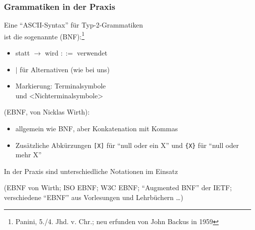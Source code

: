 \documentclass[onlymath]{beamer}
\begin{document}
\begin{frame}\frametitle{Grammatiken in der Praxis}

Eine "`ASCII-Syntax"' für Typ-2-Grammatiken\\ ist die sogenannte  (BNF):\footnote{Panini, 5./4. Jhd. v. Chr.; neu erfunden von John Backus in 1959}

\begin{itemize}
\item statt $\to$ wird \alert{$\mathtt{::=}$} verwendet 
\item \alert{$\mid$} für Alternativen (wie bei uns)
\item Markierung: \alert{\squote}Terminalsymbole\alert{\squote}\\
      und {\alert{$\texttt{<}$}Nichterminalsymbole\alert{$\texttt{>}$}}
\end{itemize}

%
\pause{} (EBNF, von Nicklas Wirth):
\begin{itemize}
\item allgemein wie BNF, aber Konkatenation mit Kommas
\item Zusätzliche Abkürzungen \alert{\texttt{[X]}} für "`null oder ein X"' und \alert{\texttt{\{X\}}} für "`null oder mehr X"'
\end{itemize}

\alert{In der Praxis sind unterschiedliche Notationen im Einsatz}

{\footnotesize (EBNF von Wirth; ISO EBNF; W3C EBNF; "`Augmented BNF"' der IETF; verschiedene "`EBNF"' aus Vorlesungen und Lehrbüchern \ldots)}

\end{frame}
\end{document}
